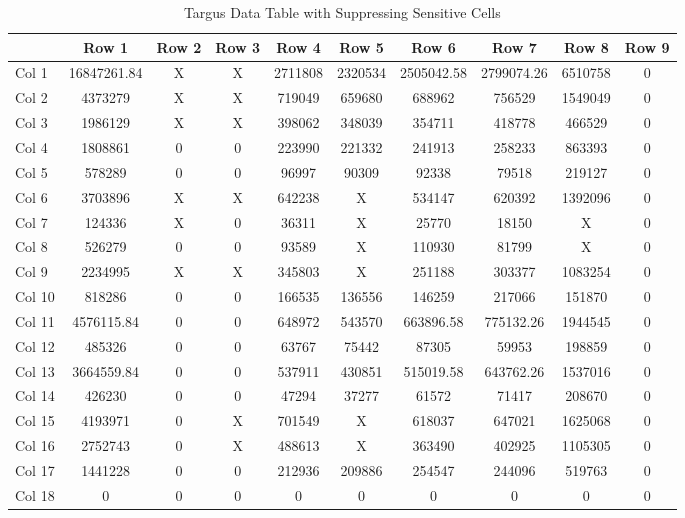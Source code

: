 \documentclass[11pt,a4paper]{article}
\begin{document}
\begin{table}[H]
    \centering
    \begin{tabular}{l | c c c c c c c c c}
         & Row 1 & Row 2 & Row 3 & Row 4 & Row 5 & Row 6 & Row 7 & Row 8 & Row 9\\
        \toprule
        Col 1 & 16847261.84 & X & X & 2711808 & 2320534 & 2505042.58 & 2799074.26 & 6510758 & 0 \\
        Col 2 & 4373279     & X & X & 719049 & 659680 & 688962 & 756529 & 1549049 & 0 \\
        Col 3 & 1986129     & X & X & 398062 & 348039 & 354711 & 418778 & 466529 & 0 \\
        Col 4 & 1808861     & 0 & 0 & 223990 & 221332 & 241913 & 258233 & 863393 & 0 \\
        Col 5 & 578289      & 0 & 0 & 96997 & 90309 & 92338 & 79518 & 219127 & 0 \\
        Col 6 & 3703896     & X & X & 642238 & X     & 534147 & 620392 & 1392096 & 0 \\
        Col 7 & 124336      & X & 0 & 36311 & X     & 25770 & 18150 & X & 0 \\
        Col 8 & 526279      & 0 & 0 & 93589 & X      & 110930 & 81799 & X & 0 \\
        Col 9 & 2234995     & X & X & 345803 & X     & 251188 & 303377 & 1083254 & 0 \\
        Col 10 & 818286     & 0 & 0 & 166535 & 136556 & 146259 & 217066 & 151870 & 0 \\
        Col 11 & 4576115.84 & 0 & 0 & 648972 & 543570 & 663896.58 & 775132.26 & 1944545 & 0 \\
        Col 12 & 485326     & 0 & 0 & 63767 & 75442 & 87305 & 59953 & 198859 & 0 \\
        Col 13 & 3664559.84 & 0 & 0 & 537911 & 430851 & 515019.58 & 643762.26 & 1537016 & 0 \\
        Col 14 & 426230     & 0 & 0 & 47294 & 37277 & 61572 & 71417 & 208670 & 0 \\
        Col 15 & 4193971    & 0 & X & 701549 & X    & 618037 & 647021 & 1625068 & 0 \\
        Col 16 & 2752743    & 0 & X & 488613 & X    & 363490 & 402925 & 1105305 & 0 \\
        Col 17 & 1441228    & 0 & 0 & 212936 & 209886 & 254547 & 244096 & 519763 & 0 \\
        Col 18 & 0          & 0 & 0 & 0 & 0 & 0 & 0 & 0 & 0 \\
      \end{tabular}
    \caption{Targus Data Table with Suppressing Sensitive Cells}
    \label{tab:targus-suppressed-table}
\end{table}



\nocite{castro_tabular, castro_benders_ampl}
\end{document}
